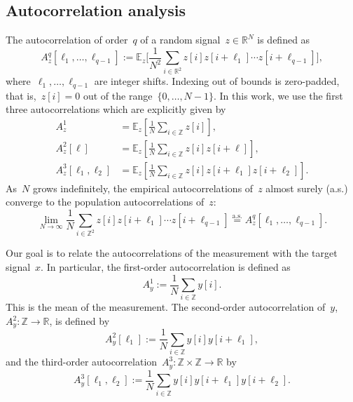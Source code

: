 \documentclass{article}
\begin{document}
\subsection{Autocorrelation analysis}
\label{subsec:ac}
The autocorrelation of order~$q$ of a random signal~\mbox{$z \in \mathbb{R}^{N}$} is defined as
\begin{equation}
A_z^q[\ell_1, \ldots, \ell_{q-1}] := \mathbb{E}_z\Big[\frac{1}{N^2} \sum_{i \in \mathbb{R}^2} z[i] z[i + \ell_1] \cdots z[i + \ell_{q-1}]\Big],
\end{equation}
where~$\ell_1, \ldots, \ell_{q-1}$ are integer shifts. Indexing out of bounds is zero-padded, that is,~\mbox{$z[i] = 0$} out of the range~\mbox{$\{0, \ldots, {N-1}\}$}. In this work, we use the first three autocorrelations which are explicitly given by
\begin{align}
\label{eq:ac1}
A_z^1 &= \mathbb{E}_z \left[\frac{1}{N} \sum_{i \in \mathbb{Z}} z\left[i\right] \right], \\
\label{eq:ac2}
A_z^2\left[\ell\right] &= \mathbb{E}_z \left[\frac{1}{N} \sum_{i \in \mathbb{Z}} z\left[i\right] z\left[i + \ell\right] \right], \\
\label{eq:ac3}
A_z^3\left[\ell_1, \ell_2\right] &= \mathbb{E}_z \left[\frac{1}{N} \sum_{i \in \mathbb{Z}} z\left[i\right] z\left[i + \ell_1\right] z\left[i + \ell_2\right] \right].
\end{align}
As~$N$ grows indefinitely, the empirical autocorrelations of~$z$ almost surely (a.s.) converge to the population autocorrelations of~$z$:
\begin{equation}
\lim_{N \rightarrow \infty} \frac{1}{N} \sum_{i \in \mathbb{Z}^2} z[i] z[i + \ell_1] \cdots z[i + \ell_{q-1}] \stackrel{\text{a.s.}}{=}A_z^q[\ell_1, \ldots, \ell_{q-1}].
\end{equation}

Our goal is to relate the autocorrelations of the measurement with the target signal~$x$. In particular, the first-order autocorrelation is defined as
\begin{equation}
\label{eq:AM1}
A_{y}^1 := \frac{1}{N} \sum_{i \in \mathbb{Z}} y[i].
\end{equation}
This is the mean of the measurement. The second-order autocorrelation of~$y$, \mbox{$A_{y}^2: \mathbb{Z} \rightarrow \mathbb{R}$}, is defined by
\begin{equation}
\label{eq:AM2}
A_{y}^2 [\ell_1] := \frac{1}{N} \sum_{i \in \mathbb{Z}} y[i] y[i + \ell_1],
\end{equation}
and the third-order autocorrelation~\mbox{$A_{y}^3: \mathbb{Z} \times \mathbb{Z} \rightarrow \mathbb{R}$} by
\begin{equation}
\label{eq:AM3}
A_{y}^3 [\ell_1, \ell_2] := \frac{1}{N} \sum_{i \in \mathbb{Z}} y[i] y[i + \ell_1] y[i + \ell_2].
\end{equation}
\end{document}
